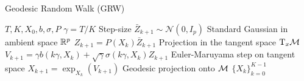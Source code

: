 \begin{algorithm}[!t]
\caption{\small Geodesic Random Walk (GRW)}
\label{alg:grw}
\begin{algorithmic}[1]
 \small
  \Require $T, K, X_0, b, \sigma, P$
  \State $\gamma = T / K$ \Comment Step-size
  \State $\bar{Z}_{k+1} \sim \mathcal{N}(0, I_p)$ \Comment Standard Gaussian in ambient space $\mathbb{R}^p$
  \State $Z_{k+1} = P(X_k) \bar{Z}_{k+1}$ \Comment Projection in the tangent space $\mathrm{T}_x \mathcal M$ 
  \State $V_{k+1} = \gamma b(k \gamma, X_k) + \sqrt{\gamma} \sigma(k \gamma, X_k) Z_{k+1}$ \Comment Euler-Maruyama step on tangent space 
  \State $X_{k+1} = \exp_{X_k}\left(V_{k+1}\right)$ \Comment Geodesic projection onto $\mathcal M$
  \EndFor
   $\{ X_k\}_{k=0}^{K-1}$
\end{algorithmic}
\end{algorithm}

